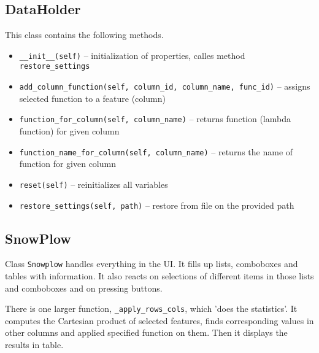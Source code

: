 \documentclass[12pt,a4paper]{article}
\newcommand{\cd}[1]{\texttt{#1}}
\begin{document}
\subsection{DataHolder}
This class contains the following methods.
\begin{itemize}
    \item \cd{\_\_init\_\_(self)} 
        – initialization of properties, calles method \cd{restore\_settings}
    \item \cd{add\_column\_function(self, column\_id, column\_name, func\_id)} 
        – assigns selected function to a feature (column)
    \item \cd{function\_for\_column(self, column\_name)}
        – returns function (lambda function) for given column 
    \item \cd{function\_name\_for\_column(self, column\_name)}
        – returns the name of function for given column
    \item \cd{reset(self)}
        – reinitializes all variables
    \item \cd{restore\_settings(self, path)}
        – restore from file on the provided path
\end{itemize}

\subsection{SnowPlow}
Class \cd{Snowplow} handles everything in the UI. 
It fills up lists, comboboxes and tables with information.
It also reacts on selections of different items in those lists and comboboxes and on pressing buttons.

\par There is one larger function, \cd{\_apply\_rows\_cols}, which 'does the statistics'. 
It computes the Cartesian product of selected features, finds corresponding values in other columns and applied specified function on them.
Then it displays the results in table.
\end{document}
